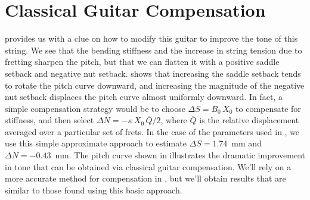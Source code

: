 %
%
%

 \section{Classical Guitar Compensation\label{sct:comp}}




 provides us with a clue on how to modify this guitar to improve the tone of this string. We see that the bending stiffness and the increase in string tension due to fretting sharpen the pitch, but that we can flatten it with a positive saddle setback and negative nut setback.  shows that increasing the saddle setback tends to rotate the pitch curve downward, and increasing the magnitude of the negative nut setback displaces the pitch curve almost uniformly downward. In fact, a simple compensation strategy would be to choose $\Delta S = B_0\, X_0$ to compensate for stiffness, and then select $\Delta N = - \kappa\, X_0\, \overline{Q} / 2$, where $\overline{Q}$ is the relative displacement averaged over a particular set of frets. In the case of the parameters used in , we use this simple approximate approach to estimate $\Delta S = 1.74$~mm and $\Delta N = -0.43$~mm. The pitch curve shown in  illustrates the dramatic improvement in tone that can be obtained via classical guitar compensation. We'll rely on a more accurate method for compensation in , but we'll obtain results that are similar to those found using this basic approach.

